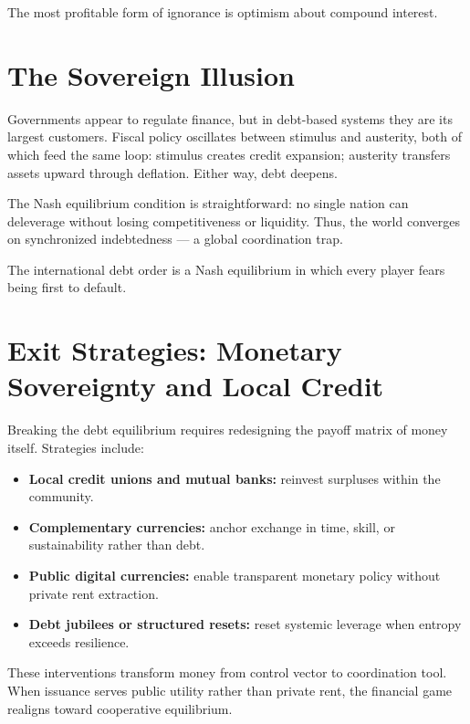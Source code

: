 \documentclass[12pt,twoside]{book}
\begin{document}
\begin{keyidea}
The most profitable form of ignorance is optimism about compound interest.
\end{keyidea}

\section{The Sovereign Illusion}

Governments appear to regulate finance, but in debt-based systems they are its largest customers.  
Fiscal policy oscillates between stimulus and austerity, both of which feed the same loop:  
stimulus creates credit expansion; austerity transfers assets upward through deflation.  
Either way, debt deepens.

The Nash equilibrium condition is straightforward:  
no single nation can deleverage without losing competitiveness or liquidity.  
Thus, the world converges on synchronized indebtedness --- a global coordination trap. \\

\begin{keyidea}
The international debt order is a Nash equilibrium in which every player fears being first to default.
\end{keyidea}

\section{Exit Strategies: Monetary Sovereignty and Local Credit}

Breaking the debt equilibrium requires redesigning the payoff matrix of money itself.  
Strategies include:
\begin{itemize}
  \item \textbf{Local credit unions and mutual banks:} reinvest surpluses within the community.  
  \item \textbf{Complementary currencies:} anchor exchange in time, skill, or sustainability rather than debt.  
  \item \textbf{Public digital currencies:} enable transparent monetary policy without private rent extraction.  
  \item \textbf{Debt jubilees or structured resets:} reset systemic leverage when entropy exceeds resilience.  
\end{itemize}

These interventions transform money from control vector to coordination tool.  
When issuance serves public utility rather than private rent, the financial game realigns toward cooperative equilibrium.
\end{document}
